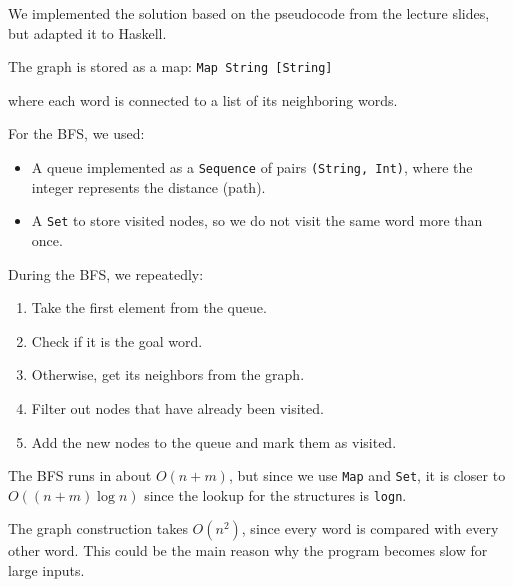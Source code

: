 \documentclass{article}
\begin{document}
We implemented the solution based on the pseudocode from the lecture slides, but adapted it to Haskell.

The graph is stored as a map: \texttt{Map String [String]}

where each word is connected to a list of its neighboring words.

For the BFS, we used:
\begin{itemize}
  \item A queue implemented as a \texttt{Sequence} of pairs \texttt{(String, Int)}, where the integer represents the distance (path).
  \item A \texttt{Set} to store visited nodes, so we do not visit the same word more than once.
\end{itemize}

During the BFS, we repeatedly:
\begin{enumerate}
  \item Take the first element from the queue.
  \item Check if it is the goal word.
  \item Otherwise, get its neighbors from the graph.
  \item Filter out nodes that have already been visited.
  \item Add the new nodes to the queue and mark them as visited.
\end{enumerate}

The BFS runs in about \(O(n + m)\), but since we use \texttt{Map} and \texttt{Set}, it is closer to \(O((n + m)\log n)\) since the lookup for the structures is \texttt{logn}.

The graph construction takes \(O(n^2)\), since every word is compared with every other word. This could be the main reason why the program becomes slow for large inputs.
\end{document}
